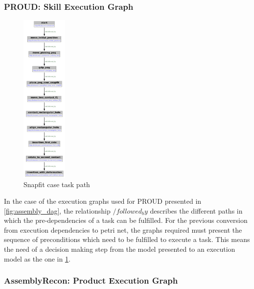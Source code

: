 \documentclass[a4paper,10pt]{article}
\begin{document}





\subsubsection{PROUD: Skill Execution Graph}

\begin{figure}[h]
	\centering
	\includegraphics[width=0.2\textwidth]{0path.png}
	\caption{Snapfit case task path}
	\label{fig:snap_path}
\end{figure}

In the case of the execution graphs used for PROUD presented in \ref{fig:assembly_dag}, the relationship $/followed_by$ describes the different paths in which the pre-dependencies of a task can be fulfilled. For the previous conversion from execution dependencies to petri net, the graphs required must present the sequence of preconditions which need to be fulfilled to execute a task. This means the need of a decision making step from the model presented to an execution model as the one in \ref{fig:snap_path}.


\subsubsection{AssemblyRecon: Product Execution Graph}
\end{document}
